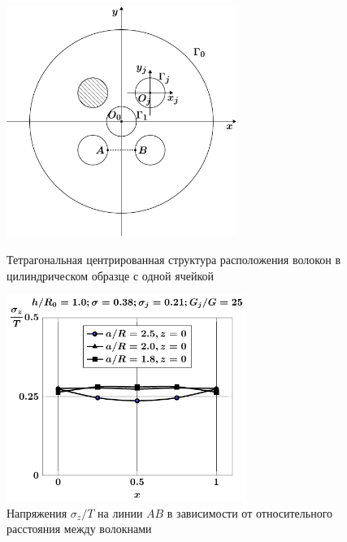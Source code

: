 \begin{figure}[h!]
\centering\footnotesize
\parbox[b]{7.5cm}{\centering\includegraphics[width=7.5cm]{inc-5.pdf}
\caption{Тетрагональная центрированная структура расположения волокон в цилиндрическом образце с одной ячейкой
\label{f:7:inc-5}}}\hfil\hfil
\parbox[b]{7.5cm}{\centering\includegraphics[width=7.8cm]{inc5-a-sig_z.pdf}
\caption{Напряжения $\sigma_z/T$ на линии $AB$ в зависимости от относительного расстояния между волокнами
\label{f:7:76}}}
\end{figure}

